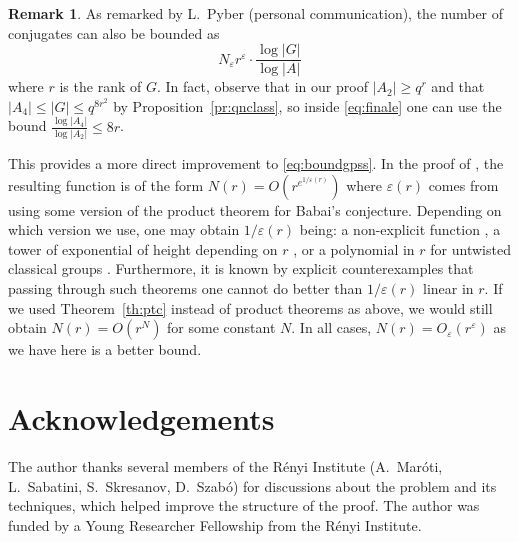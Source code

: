 \documentclass[a4paper]{article}
\theoremstyle{definition}
\newtheorem{remark}[proposition]{Remark}
\numberwithin{equation}{section}
\begin{document}
\begin{remark}\label{re:pyber}
As remarked by L.~Pyber (personal communication), the number of conjugates can also be bounded as
\begin{equation*}
N_{\varepsilon}r^{\varepsilon}\cdot\frac{\log|G|}{\log|A|}
\end{equation*}
where $r$ is the rank of $G$. In fact, observe that in our proof $|A_{2}|\geq q^{r}$ and that $|A_{4}|\leq|G|\leq q^{8r^{2}}$ by Proposition~\ref{pr:qnclass}, so inside \eqref{eq:finale} one can use the bound $\frac{\log|A_{4}|}{\log|A_{2}|}\leq 8r$.

This provides a more direct improvement to \eqref{eq:boundgpss}. In the proof of \cite[Thm.~1.3]{GPSS13}, the resulting function is of the form $N(r)=O(r^{e^{1/\varepsilon(r)}})$ where $\varepsilon(r)$ comes from using some version of the product theorem for Babai's conjecture. Depending on which version we use, one may obtain $1/\varepsilon(r)$ being: a non-explicit function \cite{BGT11}, a tower of exponential of height depending on $r$ \cite{PS16}, or a polynomial in $r$ for untwisted classical groups \cite{BDH21}. Furthermore, it is known by explicit counterexamples \cite[Ex.~77]{PS16} that passing through such theorems one cannot do better than $1/\varepsilon(r)$ linear in $r$. If we used Theorem~\ref{th:ptc} instead of product theorems as above, we would still obtain $N(r)=O(r^{N})$ for some constant $N$. In all cases, $N(r)=O_{\varepsilon}(r^{\varepsilon})$ as we have here is a better bound.
\end{remark}

\section*{Acknowledgements}

The author thanks several members of the R\'enyi Institute (A.~Mar\'oti, L.~Sabatini, S.~Skresanov, D.~Szab\'o) for discussions about the problem and its techniques, which helped improve the structure of the proof. The author was funded by a Young Researcher Fellowship from the R\'enyi Institute.



\end{document}
